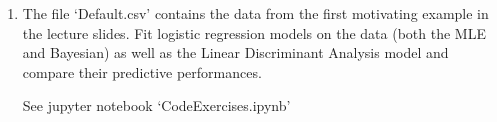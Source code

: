 \documentclass[fleqn]{article}
\begin{document}
\begin{enumerate}
\item  The file `Default.csv' contains the data from the first motivating example in the lecture slides. Fit logistic regression models on the data (both the MLE and Bayesian) as well as the Linear Discriminant Analysis model and compare their predictive performances.
\begin{answer}
See jupyter notebook `CodeExercises.ipynb'
\end{answer}

\end{enumerate}
\end{document}
